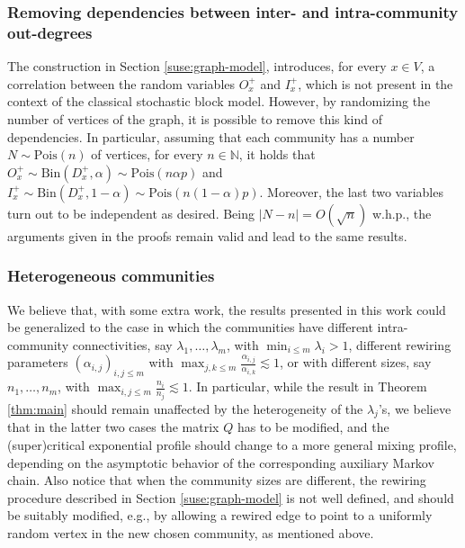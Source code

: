 \documentclass[11pt,oneside]{amsart}
\numberwithin{equation}{section}  %
\theoremstyle{plain}
\newcommand{\N}{\mathbb{N}}
\newcommand{\bin}{\text{Bin}}
\newcommand{\pois}{\text{Pois}}
\begin{document}
\subsubsection*{Removing dependencies between inter- and intra-community out-degrees}
	The construction in Section \ref{suse:graph-model}, introduces, for every $x \in V$, a correlation between the random variables $O_x^+$ and $I_x^+$, which is not present in the context of the classical stochastic block model. 
	However, by randomizing the number of vertices of the graph, it is possible to remove this kind of dependencies. In particular,
assuming that each community has a number $N\sim \pois(n)$ of vertices, for every $n \in \N$, it holds that 
	$O_x^+\sim \bin(D_x^+,\alpha) \sim \pois(n\alpha p)$
	and $I_x^+\sim \bin(D_x^+,1-\alpha) \sim \pois(n(1-\alpha) p)$. Moreover, the last two variables turn out to be independent as desired.
    Being $|N-n|=O(\sqrt{n})$ w.h.p., the arguments given in the proofs remain valid and lead to the same results. 


\subsubsection*{Heterogeneous communities}
We believe that, with some extra work, the results presented in this work could be generalized to the case
%
in which the communities have different intra-community connectivities, say $\lambda_1,\dots,\lambda_m$, with $\min_{i \le m}\lambda_i>1$, different rewiring parameters $(\alpha_{i,j})_{i,j \le m}$ with $\max_{j,k\le m}\frac{\alpha_{i,j}}{\alpha_{i,k}}\lesssim1$, or with different sizes, say $n_1,\dots, n_m$, with $\max_{i,j\le m}\frac{n_i}{n_j}\lesssim1$. 
%
%
In particular, while the result in Theorem \ref{thm:main} should remain unaffected by the heterogeneity of the $\lambda_j$'s, we believe that in the latter two cases the matrix $Q$ has to be modified, 
and the (super)critical exponential profile should change to a more general mixing profile, depending on the asymptotic behavior of the corresponding auxiliary Markov chain.
Also notice that when the community sizes are different, the rewiring procedure described in Section \ref{suse:graph-model} is not well defined, and should be suitably modified, e.g., by allowing a rewired edge to point to a uniformly random vertex in the new chosen community, as mentioned above.
\end{document}
